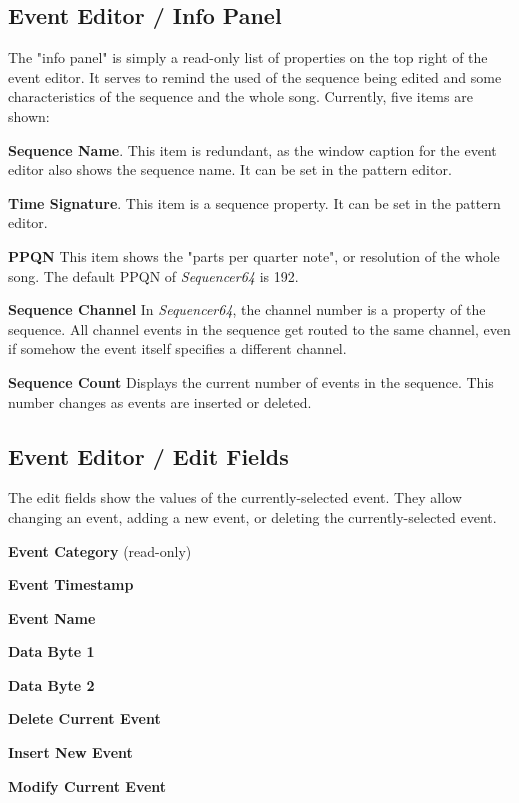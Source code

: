 \subsection{Event Editor / Info Panel}
\label{subsec:seq64_event_editor_info}

   The "info panel" is simply a read-only list of properties on the top right
   of the event editor.  It serves to remind the used of the sequence being
   edited and some characteristics of the sequence and the whole song.
   Currently, five items are shown:

   \begin{enumber}
      \item \textbf{Sequence Name}.
         This item is redundant, as the window caption for the event editor
         also shows the sequence name.  It can be set in the pattern editor.
      \item \textbf{Time Signature}.
         This item is a sequence property.  It can be set in the pattern
         editor.
      \item \textbf{PPQN}
         This item shows the "parts per quarter note", or resolution of the
         whole song.  The default PPQN of \textsl{Sequencer64} is 192.
      \item \textbf{Sequence Channel}
         In \textsl{Sequencer64}, the channel number is a property of the
         sequence.  All channel events in the sequence get routed to the same
         channel, even if somehow the event itself specifies a different
         channel.
      \item \textbf{Sequence Count}
         Displays the current number of events in the sequence.
         This number changes as events are inserted or deleted.
   \end{enumber}

\subsection{Event Editor / Edit Fields}
\label{subsec:seq64_event_editor_fields}

   The edit fields show the values of the currently-selected event.  They allow
   changing an event, adding a new event, or deleting the currently-selected
   event.

   \begin{enumber}
      \item \textbf{Event Category} (read-only)
      \item \textbf{Event Timestamp}
      \item \textbf{Event Name}
      \item \textbf{Data Byte 1}
      \item \textbf{Data Byte 2}
      \item \textbf{Delete Current Event}
      \item \textbf{Insert New Event}
      \item \textbf{Modify Current Event}
   \end{enumber}

